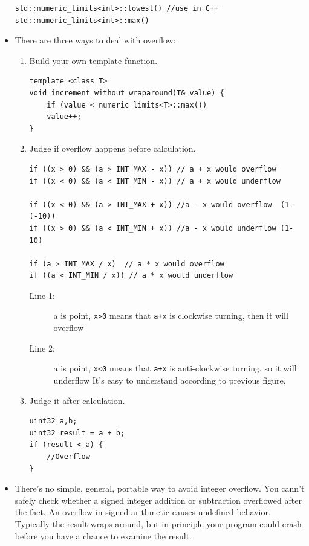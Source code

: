 \documentclass[a4paper,11pt,twoside]{book}
\begin{document}
\begin{itemize}
\begin{lstlisting}[numbers=none]
std::numeric_limits<int>::lowest() //use in C++
std::numeric_limits<int>::max()
\end{lstlisting}
	
	\item There are three ways to deal with overflow:
	\begin{enumerate}
		\item Build your own template function.
\begin{lstlisting}[numbers=none]
template <class T>
void increment_without_wraparound(T& value) {
	if (value < numeric_limits<T>::max())
	value++;
}
\end{lstlisting}
		
		\item  Judge if overflow happens before calculation.
		
\begin{lstlisting}
if ((x > 0) && (a > INT_MAX - x)) // a + x would overflow 
if ((x < 0) && (a < INT_MIN - x)) // a + x would underflow

if ((x < 0) && (a > INT_MAX + x)) //a - x would overflow  (1-(-10))
if ((x > 0) && (a < INT_MIN + x)) //a - x would underflow (1-10)

if (a > INT_MAX / x)  // a * x would overflow 
if ((a < INT_MIN / x)) // a * x would underflow 
\end{lstlisting}
		\begin{description}
			\item[Line 1:] a is point, \texttt{x>0} means that \texttt{a+x} is clockwise turning, then it will overflow
			\item[Line 2:] a is point, \texttt{x<0} means that \texttt{a+x} is anti-clockwise turning,  so it will underflow It's easy to understand according to previous figure.
		\end{description}
		
		\item Judge it after calculation.
\begin{lstlisting}[numbers = none]
uint32 a,b;
uint32 result = a + b;
if (result < a) {
	//Overflow
}
\end{lstlisting}
	\end{enumerate}
	
	\item There's no simple, general, portable way to avoid integer overflow. You cann't safely check whether a signed integer addition or subtraction overflowed after the fact. An overflow in signed arithmetic causes undefined behavior. Typically the result wraps around, but in principle your program could crash before you have a chance to examine the result.
	

\end{itemize}
\end{document}
